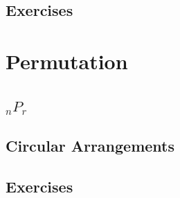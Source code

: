 \subsection{Exercises}

\newpage
\section{Permutation}
\noindent{}
\subsection{$_nP_r$}
\subsection{Circular Arrangements}
\subsection{Exercises}

